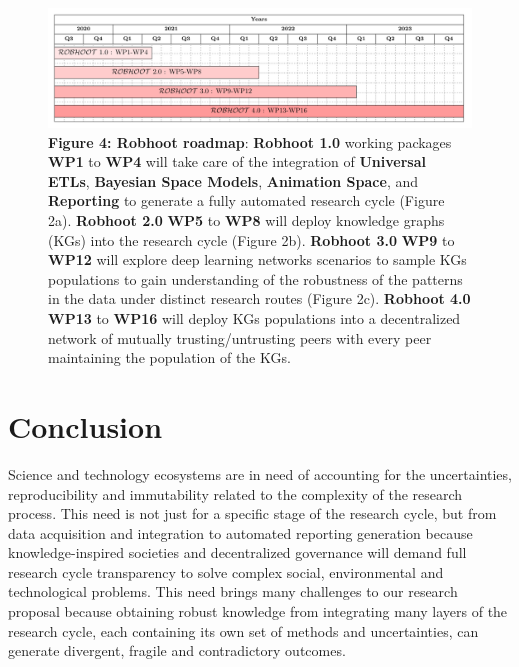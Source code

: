 \documentclass[10pt, a4paper, twocolumn]{article} %
\begin{document}
{\begin{figure}[ht]
  \includegraphics[width=1\textwidth]{GanttChartWhitePaper.pdf}
    {\small {\bf Figure 4: Robhoot roadmap}: {\bf Robhoot 1.0} working
      packages {\bf WP1} to {\bf WP4} will take care of the
      integration of {\bf Universal ETLs}, {\bf Bayesian Space
        Models}, {\bf Animation Space}, and {\bf Reporting} to
      generate a fully automated research cycle (Figure 2a). {\bf
        Robhoot 2.0} {\bf WP5} to {\bf WP8} will deploy knowledge
      graphs (KGs) into the research cycle (Figure 2b). {\bf Robhoot
        3.0} {\bf WP9} to {\bf WP12} will explore deep learning
      networks scenarios to sample KGs populations to gain
      understanding of the robustness of the patterns in the data
      under distinct research routes (Figure 2c). {\bf Robhoot 4.0}
      {\bf WP13} to {\bf WP16} will deploy KGs populations into a
      decentralized network of mutually trusting/untrusting peers with
      every peer maintaining the population of the KGs.}
\end{figure}


\section{Conclusion}
Science and technology ecosystems are in need of accounting for the
uncertainties, reproducibility and immutability related to the
complexity of the research process. This need is not just for a
specific stage of the research cycle, but from data acquisition and
integration to automated reporting generation because
knowledge-inspired societies and decentralized governance will demand
full research cycle transparency to solve complex social,
environmental and technological problems. This need brings many
challenges to our research proposal because obtaining robust knowledge
from integrating many layers of the research cycle, each containing
its own set of methods and uncertainties, can generate divergent,
fragile and contradictory outcomes.

}
\end{document}
